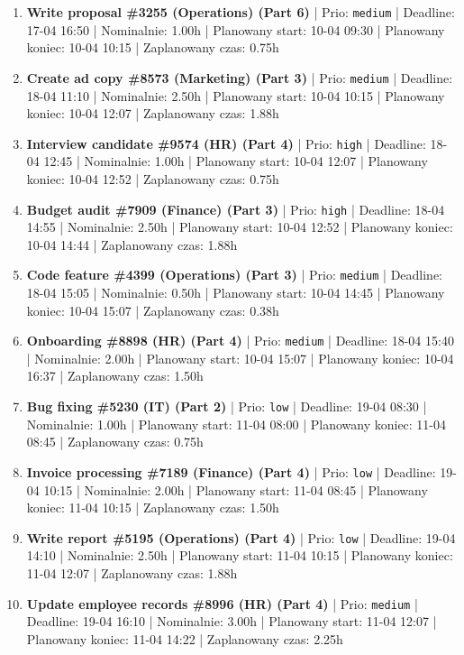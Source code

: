 {\begin{enumerate}
  \item [\textbf{14654}] \textbf{Write proposal \#3255 (Operations) (Part 6)} | Prio: \texttt{medium} | Deadline: 17-04 16:50 | Nominalnie: 1.00h | Planowany start: 10-04 09:30 | Planowany koniec: 10-04 10:15 | Zaplanowany czas: 0.75h
  \item [\textbf{14677}] \textbf{Create ad copy \#8573 (Marketing) (Part 3)} | Prio: \texttt{medium} | Deadline: 18-04 11:10 | Nominalnie: 2.50h | Planowany start: 10-04 10:15 | Planowany koniec: 10-04 12:07 | Zaplanowany czas: 1.88h
  \item [\textbf{14612}] \textbf{Interview candidate \#9574 (HR) (Part 4)} | Prio: \texttt{high} | Deadline: 18-04 12:45 | Nominalnie: 1.00h | Planowany start: 10-04 12:07 | Planowany koniec: 10-04 12:52 | Zaplanowany czas: 0.75h
  \item [\textbf{14616}] \textbf{Budget audit \#7909 (Finance) (Part 3)} | Prio: \texttt{high} | Deadline: 18-04 14:55 | Nominalnie: 2.50h | Planowany start: 10-04 12:52 | Planowany koniec: 10-04 14:44 | Zaplanowany czas: 1.88h
  \item [\textbf{14664}] \textbf{Code feature \#4399 (Operations) (Part 3)} | Prio: \texttt{medium} | Deadline: 18-04 15:05 | Nominalnie: 0.50h | Planowany start: 10-04 14:45 | Planowany koniec: 10-04 15:07 | Zaplanowany czas: 0.38h
  \item [\textbf{14636}] \textbf{Onboarding \#8898 (HR) (Part 4)} | Prio: \texttt{medium} | Deadline: 18-04 15:40 | Nominalnie: 2.00h | Planowany start: 10-04 15:07 | Planowany koniec: 10-04 16:37 | Zaplanowany czas: 1.50h
  \item [\textbf{14680}] \textbf{Bug fixing \#5230 (IT) (Part 2)} | Prio: \texttt{low} | Deadline: 19-04 08:30 | Nominalnie: 1.00h | Planowany start: 11-04 08:00 | Planowany koniec: 11-04 08:45 | Zaplanowany czas: 0.75h
  \item [\textbf{14678}] \textbf{Invoice processing \#7189 (Finance) (Part 4)} | Prio: \texttt{low} | Deadline: 19-04 10:15 | Nominalnie: 2.00h | Planowany start: 11-04 08:45 | Planowany koniec: 11-04 10:15 | Zaplanowany czas: 1.50h
  \item [\textbf{14687}] \textbf{Write report \#5195 (Operations) (Part 4)} | Prio: \texttt{low} | Deadline: 19-04 14:10 | Nominalnie: 2.50h | Planowany start: 11-04 10:15 | Planowany koniec: 11-04 12:07 | Zaplanowany czas: 1.88h
  \item [\textbf{14655}] \textbf{Update employee records \#8996 (HR) (Part 4)} | Prio: \texttt{medium} | Deadline: 19-04 16:10 | Nominalnie: 3.00h | Planowany start: 11-04 12:07 | Planowany koniec: 11-04 14:22 | Zaplanowany czas: 2.25h

\end{enumerate}}
